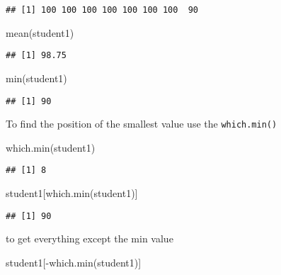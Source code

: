 \documentclass[
]{article}
\newenvironment{Shaded}{\begin{snugshade}}{\end{snugshade}}
\newcommand{\FunctionTok}[1]{\textcolor[rgb]{0.00,0.00,0.00}{#1}}
\newcommand{\NormalTok}[1]{#1}
\newcommand{\SpecialCharTok}[1]{\textcolor[rgb]{0.00,0.00,0.00}{#1}}
\begin{document}
\begin{verbatim}
## [1] 100 100 100 100 100 100 100  90
\end{verbatim}

\begin{Shaded}
\begin{Highlighting}[]
\FunctionTok{mean}\NormalTok{(student1)}
\end{Highlighting}
\end{Shaded}

\begin{verbatim}
## [1] 98.75
\end{verbatim}

\begin{Shaded}
\begin{Highlighting}[]
\FunctionTok{min}\NormalTok{(student1)}
\end{Highlighting}
\end{Shaded}

\begin{verbatim}
## [1] 90
\end{verbatim}

To find the position of the smallest value use the \texttt{which.min()}

\begin{Shaded}
\begin{Highlighting}[]
\FunctionTok{which.min}\NormalTok{(student1)}
\end{Highlighting}
\end{Shaded}

\begin{verbatim}
## [1] 8
\end{verbatim}

\begin{Shaded}
\begin{Highlighting}[]
\NormalTok{student1[}\FunctionTok{which.min}\NormalTok{(student1)]}
\end{Highlighting}
\end{Shaded}

\begin{verbatim}
## [1] 90
\end{verbatim}

to get everything except the min value

\begin{Shaded}
\begin{Highlighting}[]
\NormalTok{student1[}\SpecialCharTok{{-}}\FunctionTok{which.min}\NormalTok{(student1)]}
\end{Highlighting}
\end{Shaded}
\end{document}
